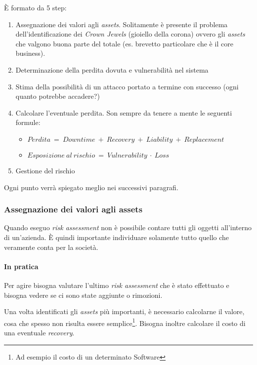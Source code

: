 È formato da 5 step:
\begin{enumerate}
 \item Assegnazione dei valori agli \textit{assets}. Solitamente è presente
il problema dell'identificazione dei \textit{Crown Jewels} (gioiello della
corona) ovvero gli \textit{assets} che valgono buona parte del totale (es.
brevetto particolare che è il core business).
 \item Determinazione della perdita dovuta e vulnerabilità nel sistema
 \item Stima della possibilità di un attacco portato a termine con successo
(ogni quanto potrebbe accadere?)
 \item Calcolare l'eventuale perdita. Son sempre da tenere a mente le seguenti
formule:
 \begin{itemize}
 	\item $Perdita\ =\ Downtime\ +\ Recovery\ +\ Liability\ +\ Replacement$
 	\item $Esposizione\ al\ rischio\ =\ Vulnerability\ \cdot\ Loss$
 \end{itemize}
 \item Gestione del rischio
\end{enumerate}

Ogni punto verrà spiegato meglio nei successivi paragrafi.


\subsubsection{Assegnazione dei valori agli assets}

Quando eseguo \textit{risk assessment} non è possibile contare tutti gli
oggetti all'interno di un'azienda. È quindi importante individuare solamente
tutto quello che veramente conta per la società.

\paragraph*{In pratica}

Per agire bisogna valutare l'ultimo \textit{risk assessment} che è stato
effettuato e bisogna vedere se ci sono state aggiunte o rimozioni.

Una volta identificati gli \textit{assets} più importanti, è necessario
calcolarne il valore, cosa che spesso non risulta essere semplice\footnote{Ad
esempio il costo di un determinato Software}. Bisogna inoltre calcolare il
costo di una eventuale \textit{recovery}.



